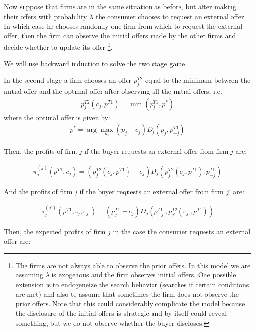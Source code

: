 \documentclass[12pt]{article}
\begin{document}
Now suppose that firms are in the same situation as before, but after making their offers with probability $\lambda$ the consumer chooses to request an external offer. In which case he chooses randomly one firm from which to request the external offer, then the firm can observe the initial offers made by the other firms and decide whether to update its offer \footnote{The firms are not always able to observe the prior offers. In this model we are assuming $\lambda$ is exogenous and the firm observes initial offers. One possible extension is to endogeneize the search behavior (searches if certain conditions are met) and also to assume that sometimes the firm does not observe the prior offers. Note that this could considerably complicate the model because the disclosure of the initial offers is strategic and by itself could reveal something, but we do not observe whether the buyer discloses. }.

We will use backward induction to solve the two stage game. 

In the second stage a firm chooses an offer $p_{j}^{T2}$ equal to the minimum between the initial offer and the optimal offer after observing all the initial offers, i.e. 
\begin{align}
\label{eq:base_equilibrium2} %
    p_{j}^{T2}(c_j, p^{T1}) = \min(p_j^{T1}, p^*)
\end{align}
where the optimal offer is given by: 
\begin{align} %
    p^* = \arg \max_{p_j} (p_j - c_j) D_j(p_j, p_{-j}^{T1}) 
\end{align}



Then, the profits of firm $j$ if the buyer requests an external offer from firm $j$ are: 

\begin{align}\label{eq:asking_j} %
    \pi_j^{(j)}(p^{T1}, c_j) =   (p_j^{T2}(c_j, p^{T1}) - c_j) D_j(p_j^{T2}(c_j, p^{T1}), p_{-j}^{T1}) 
\end{align}

And the profits of firm $j$ if the buyer requests an external offer from firm $j'$ are: 

\begin{align}\label{eq:asking_j'} %
    \pi_j^{(j')}(p^{T1}, c_j, c_{j'}) = (p_j^{T1} - c_j) D_j(p_{-j'}^{T1}, p_{ j'}^{T2}(c_{j'}, p^{T1})) 
\end{align}

Then, the expected profits of firm $j$ in the case the consumer requests an external offer are: 
\end{document}
